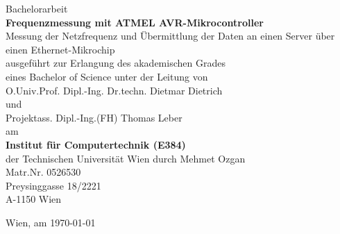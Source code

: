 \thispagestyle{plain}
\begin{titlepage}
	\large
	

	\begin{center}

		{\Large{Bachelorarbeit}}\\\vfill
		{\LARGE\bf Frequenzmessung mit ATMEL AVR-Mikrocontroller}\\[5mm]
		Messung der Netzfrequenz und Übermittlung der Daten an einen Server über einen Ethernet-Mikrochip\\\vfill
		ausgeführt zur Erlangung des akademischen Grades \\
		eines Bachelor of Science unter der Leitung von\\\vfill
		O.Univ.Prof. Dipl.-Ing. Dr.techn. Dietmar Dietrich \\
		und \\
		Projektass. Dipl.-Ing.(FH) Thomas Leber \\\vfill
		am\\\vfill
		{\Large\bf Institut für Computertechnik (E384)}\\
		der Technischen Universität Wien
		\vfill
		durch
		\vfill
		Mehmet Ozgan\\
		Matr.Nr. 0526530\\
		Preysinggasse 18/2221\\
		A-1150 Wien\\\vfill
	\end{center}
	
	Wien, am \today\hfill\hrulefill
	
\end{titlepage}

